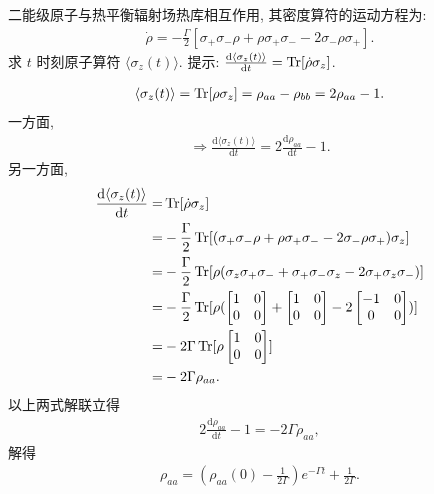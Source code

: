 \documentclass{assignment}
\begin{document}
\begin{prob}
    二能级原子与热平衡辐射场热库相互作用, 其密度算符的运动方程为:
    \begin{align}
        \dot{\rho}=-\frac{\Gamma}{2}[\sigma_+\sigma_-\rho+\rho\sigma_+\sigma_--2\sigma_-\rho\sigma_+].
    \end{align}
    求 $t$ 时刻原子算符 $\langle\sigma_z(t)\rangle$. 提示: $\frac{\mathrm{d}\langle\sigma_z(t)\rangle}{\mathrm{d}t}=\operatorname{Tr}[\dot{\rho}\sigma_z]$.
\end{prob}
\begin{sol}
    \begin{align}
        \langle\sigma_z(t)\rangle=\operatorname{Tr}[\rho\sigma_z]=\rho_{aa}-\rho_{bb}=2\rho_{aa}-1.
    \end{align}
    一方面,
    \begin{align}
        \Longrightarrow\frac{\mathrm{d}\langle\sigma_z(t)\rangle}{\mathrm{d}t}=2\frac{\mathrm{d}\rho_{aa}}{\mathrm{d}t}-1.
    \end{align}
    另一方面,
    \begin{align}
        \notag\frac{\mathrm{d}\langle\sigma_z(t)\rangle}{\mathrm{d}t}=&\operatorname{Tr}[\dot{\rho}\sigma_z]\\
        \notag=&-\frac{\Gamma}{2}\operatorname{Tr}[(\sigma_+\sigma_-\rho+\rho\sigma_+\sigma_--2\sigma_-\rho\sigma_+)\sigma_z]\\
        \notag=&-\frac{\Gamma}{2}\operatorname{Tr}[\rho(\sigma_z\sigma_+\sigma_-+\sigma_+\sigma_-\sigma_z-2\sigma_+\sigma_z\sigma_-)]\\
        \notag=&-\frac{\Gamma}{2}\operatorname{Tr}[\rho(\begin{bmatrix}
            1&0\\
            0&0
        \end{bmatrix}+\begin{bmatrix}
            1&0\\
            0&0
        \end{bmatrix}-2\begin{bmatrix}
            -1&0\\
            0&0
        \end{bmatrix})]\\
        \notag=&-2\Gamma\operatorname{Tr}[\rho\begin{bmatrix}
            1&0\\
            0&0
        \end{bmatrix}]\\
        =&-2\Gamma\rho_{aa}.
    \end{align}
    以上两式解联立得
    \begin{align}
        2\frac{\mathrm{d}\rho_{aa}}{\mathrm{d}t}-1=-2\Gamma\rho_{aa},
    \end{align}
    解得
    \begin{align}
        \rho_{aa}=\left(\rho_{aa}(0)-\frac{1}{2\Gamma}\right)e^{-\Gamma t}+\frac{1}{2\Gamma}.
    \end{align}
\end{sol}
\end{document}
